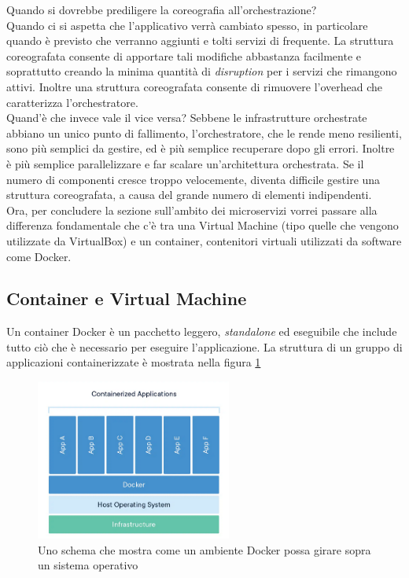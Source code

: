 Quando si dovrebbe prediligere la coreografia all'orchestrazione?
\\
Quando ci si aspetta che l'applicativo verrà cambiato spesso, in particolare quando è previsto che verranno aggiunti e tolti servizi di frequente. La struttura coreografata consente di apportare tali modifiche abbastanza facilmente e soprattutto creando la minima quantità di \textit{disruption} per i servizi che rimangono attivi.\cite{AzureCloudPatterns} Inoltre una struttura coreografata consente di rimuovere l'overhead che caratterizza l'orchestratore.
\\
Quand'è che invece vale il vice versa?
Sebbene le infrastrutture orchestrate abbiano un unico punto di fallimento, l'orchestratore, che le rende meno resilienti, sono più semplici da gestire, ed è più semplice recuperare dopo gli errori. Inoltre è più semplice parallelizzare e far scalare un'architettura orchestrata. Se il numero di componenti cresce troppo velocemente, diventa difficile gestire una struttura coreografata, a causa del grande numero di elementi indipendenti.\cite{AzureCloudPatterns}
\\
Ora, per concludere la sezione sull'ambito dei microservizi vorrei passare alla differenza fondamentale che c'è tra una Virtual Machine (tipo quelle che vengono utilizzate da VirtualBox) e un container, contenitori virtuali utilizzati da software come Docker. 

\subsection{Container e Virtual Machine}
Un container Docker è un pacchetto leggero, \emph{standalone} ed eseguibile che include tutto ciò che è necessario per eseguire l'applicazione.\cite{Containers} La struttura di un gruppo di applicazioni containerizzate è mostrata nella figura \ref{fig:containerStructure}

\begin{figure}[h]
    \centering
    \includegraphics[height=200px]{./images/docker_container.png}
    \caption{Uno schema che mostra come un ambiente Docker possa girare sopra un sistema operativo}
    \label{fig:containerStructure}
\end{figure}

